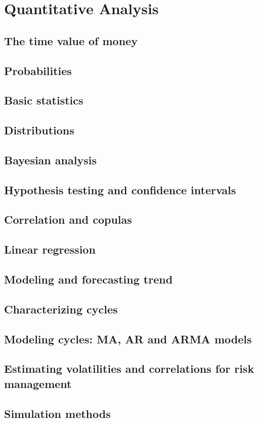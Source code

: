 \section{Quantitative Analysis}
\subsection{The time value of money}
\subsection{Probabilities}
\subsection{Basic statistics}
\subsection{Distributions}
\subsection{Bayesian analysis}
\subsection{Hypothesis testing and confidence intervals}
\subsection{Correlation and copulas}
\subsection{Linear regression}
\subsection{Modeling and forecasting trend}
\subsection{Characterizing cycles}
\subsection{Modeling cycles: MA, AR and ARMA models}
\subsection{Estimating volatilities and correlations for risk management}
\subsection{Simulation methods}

